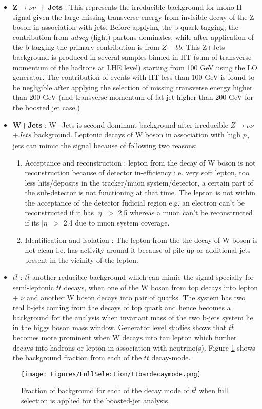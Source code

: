 \begin{itemize}
\item {\bf Z$\rightarrow \nu\nu$ + Jets}  : This represents the irreducible background for mono-H signal given the large missing transverse energy from invisible decay 
  of the Z boson in association with jets. Before applying the b-quark tagging,  the contribution from $udscg$ (light) partons dominates, while after application of the b-tagging 
  the primary contribution is from $Z+b\bar{b}$. This Z+Jets background is produced in several samples binned in HT (sum of transverse momentum of the hadrons at LHE level) starting
  from 100 GeV using the \MADGRAPH LO generator. The contribution of events with HT less than 100 GeV is found to be negligible after applying the selection of missing transverse 
  energy higher than 200 GeV (and transverse momentum of fat-jet higher than 200 GeV for the boosted jet case.)
  
\item {\bf W+Jets} : W+Jets is second dominant background after irreducible $Z \rightarrow \nu\nu$+$Jets$ background. 
  Leptonic decays of W boson in association with high $p_{T}$ jets can mimic the signal because of following two reasons:
  \begin{enumerate}
  \item Acceptance and reconstruction : lepton from the decay of W boson  is not reconstruction because of detector in-efficiency i.e. very soft lepton, too less hits/deposits in 
    the tracker/muon system/detector, a certain part of the sub-detector is not functioning at that time. The lepton is not within the acceptance of the detector fudicial region 
e.g. an electron can't be reconstructed if it has $|\eta|$ $>$ 2.5 whereas a muon can't be reconstructed if its $|\eta|$ $>$ 2.4 due to muon system coverage.
\item Identification and isolation : The lepton from the the decay of W boson is not clean i.e. has activity around it because of pile-up or additional jets present in the
  vicinity of the lepton.
  \end{enumerate}

\item {\bf $t \bar{t}$} : $t \bar{t}$ another reducible background which can mimic the signal specially for semi-leptonic $t \bar{t}$ decays, when one of the W boson from top 
decays into lepton + $\nu$ and another W boson decays into pair of quarks. The system has two real b-jets coming from the decays of top quark and hence becomes a background 
for the analysis when invariant mass of the two b-jets system lie in the higgs boson mass window. Generator level studies shows that $t \bar{t}$ becomes more prominent when 
W decays into tau lepton which further decays into hadrons or lepton in association with neutrino(s). Figure \ref{ttbardecaymodes} shows the background fraction from each of the 
$t \bar{t}$ decay-mode. 
\end{itemize}

\begin{figure}[htbp]
\centering
\texttt{[image: Figures/FullSelection/ttbardecaymode.png]}
\caption{Fraction of background for each of the decay mode of $t \bar{t}$ when full selection is applied for the boosted-jet analysis.}
\label{ttbardecaymodes}
\end{figure}

